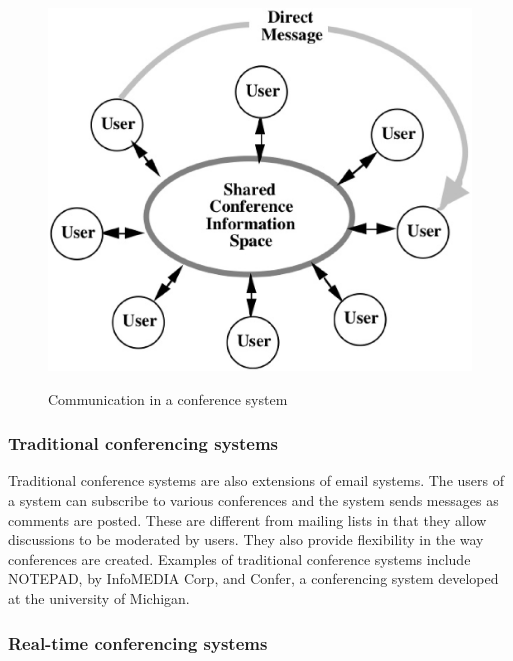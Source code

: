 \begin{figure}[htp]
  \caption{Communication in a conference system\cite{journals/iwc/Rodden91}}
  \centering
  \includegraphics[scale=.5]{ConfSys.eps}
  \label{CONF_SYS}
\end{figure}


\subsubsection{Traditional conferencing systems}
Traditional conference systems are also extensions of email
systems. The users of a system can subscribe to various conferences
and the system sends messages as comments are posted.  These are
different from mailing lists in that they allow discussions to be
moderated by users.  They also provide flexibility in the way
conferences are created.  Examples of traditional conference systems
include NOTEPAD, by InfoMEDIA Corp, and Confer, a conferencing system
developed at the university of Michigan.

\subsubsection{Real-time conferencing systems}

